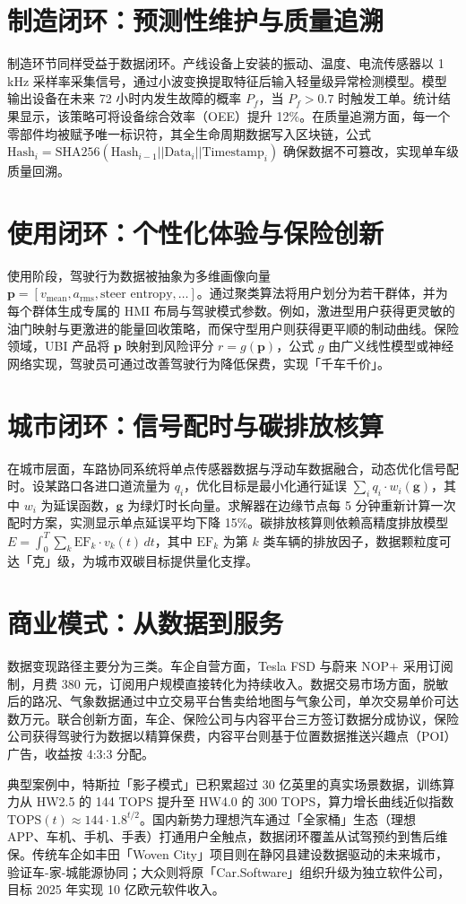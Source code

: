 \chapter{制造闭环：预测性维护与质量追溯}
制造环节同样受益于数据闭环。产线设备上安装的振动、温度、电流传感器以 1 kHz 采样率采集信号，通过小波变换提取特征后输入轻量级异常检测模型。模型输出设备在未来 72 小时内发生故障的概率 $P_f$，当 $P_f > 0.7$ 时触发工单。统计结果显示，该策略可将设备综合效率（OEE）提升 12\%{}。在质量追溯方面，每一个零部件均被赋予唯一标识符，其全生命周期数据写入区块链，公式 $\text{Hash}_{i} = \text{SHA256}(\text{Hash}_{i-1} || \text{Data}_i || \text{Timestamp}_i)$ 确保数据不可篡改，实现单车级质量回溯。\par
\chapter{使用闭环：个性化体验与保险创新}
使用阶段，驾驶行为数据被抽象为多维画像向量 $\mathbf{p} = [v_{\text{mean}}, a_{\text{rms}}, \text{steer entropy}, \ldots]$。通过聚类算法将用户划分为若干群体，并为每个群体生成专属的 HMI 布局与驾驶模式参数。例如，激进型用户获得更灵敏的油门映射与更激进的能量回收策略，而保守型用户则获得更平顺的制动曲线。保险领域，UBI 产品将 $\mathbf{p}$ 映射到风险评分 $r = g(\mathbf{p})$，公式 $g$ 由广义线性模型或神经网络实现，驾驶员可通过改善驾驶行为降低保费，实现「千车千价」。\par
\chapter{城市闭环：信号配时与碳排放核算}
在城市层面，车路协同系统将单点传感器数据与浮动车数据融合，动态优化信号配时。设某路口各进口道流量为 $q_i$，优化目标是最小化通行延误 $\sum_i q_i \cdot w_i(\mathbf{g})$，其中 $w_i$ 为延误函数，$\mathbf{g}$ 为绿灯时长向量。求解器在边缘节点每 5 分钟重新计算一次配时方案，实测显示单点延误平均下降 15\%{}。碳排放核算则依赖高精度排放模型 $E = \int_0^T \sum_k \text{EF}_k \cdot v_k(t) \, dt$，其中 $\text{EF}_k$ 为第 $k$ 类车辆的排放因子，数据颗粒度可达「克」级，为城市双碳目标提供量化支撑。\par
\chapter{商业模式：从数据到服务}
数据变现路径主要分为三类。车企自营方面，Tesla FSD 与蔚来 NOP+ 采用订阅制，月费 380 元，订阅用户规模直接转化为持续收入。数据交易市场方面，脱敏后的路况、气象数据通过中立交易平台售卖给地图与气象公司，单次交易单价可达数万元。联合创新方面，车企、保险公司与内容平台三方签订数据分成协议，保险公司获得驾驶行为数据以精算保费，内容平台则基于位置数据推送兴趣点（POI）广告，收益按 4:3:3 分配。\par
典型案例中，特斯拉「影子模式」已积累超过 30 亿英里的真实场景数据，训练算力从 HW2.5 的 144 TOPS 提升至 HW4.0 的 300 TOPS，算力增长曲线近似指数 $\text{TOPS}(t) \approx 144 \cdot 1.8^{t/2}$。国内新势力理想汽车通过「全家桶」生态（理想 APP、车机、手机、手表）打通用户全触点，数据闭环覆盖从试驾预约到售后维保。传统车企如丰田「Woven City」项目则在静冈县建设数据驱动的未来城市，验证车-家-城能源协同；大众则将原「Car.Software」组织升级为独立软件公司，目标 2025 年实现 10 亿欧元软件收入。\par
